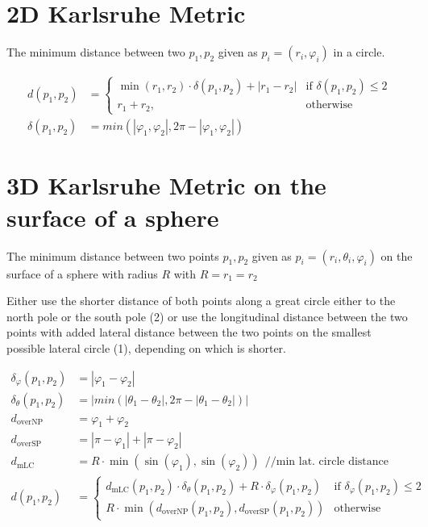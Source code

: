 \documentclass{article}
\begin{document}
\section{2D Karlsruhe Metric}
The minimum distance between two $p_1, p_2$ given as $p_i = (r_i, \varphi_i)$ in a circle.

\begin{align}
d(p_1, p_2) & = 
    \begin{cases}
        \min(r_1, r_2) \cdot \delta(p_1, p_2) + |r_1-r_2|& \text{if } \delta(p_1, p_2) \leq 2\\
        r_1 + r_2,              & \text{otherwise}
    \end{cases} \\
\delta(p_1, p_2) &= min(|\varphi_1, \varphi_2|, 2\pi - |\varphi_1, \varphi_2|)
\end{align}

\section{3D Karlsruhe Metric on the surface of a sphere}
The minimum distance between two points $p_1, p_2$ given as $p_i = (r_i, \theta_i, \varphi_i)$ on the surface of a sphere with radius $R$ with $R = r_1 = r_2$

Either use the shorter distance of both points along a great circle either to the north pole or the south pole (2) or use the longitudinal distance between the two points with added lateral distance between the two points on the smallest possible lateral circle (1), depending on which is shorter.

\begin{align}
\delta_\varphi(p_1, p_2) &= |\varphi_1 - \varphi_2|\\
\delta_\theta(p_1, p_2) &= |min(|\theta_1 - \theta_2|, 2\pi - |\theta_1 - \theta_2|)|\\
d_{\text{overNP}}&=\varphi_1 +\varphi_2 \\
d_{\text{overSP}}&=|\pi-\varphi_1| +|\pi-\varphi_2| \\
d_{\text{mLC}}&=R\cdot\min(\sin(\varphi_1), \sin(\varphi_2))\ \ // \text{min lat. circle distance}\\
d(p_1, p_2)&=
    \begin{cases}
        d_{\text{mLC}}(p_1, p_2)\cdot\delta_\theta(p_1, p_2)+R\cdot\delta_\varphi(p_1, p_2)& \text{if } \delta_\varphi(p_1, p_2) \leq 2\\
        R\cdot\min(d_\text{overNP}(p_1, p_2),d_\text{overSP}(p_1, p_2))              & \text{otherwise}
    \end{cases} 
\end{align}
\end{document}
